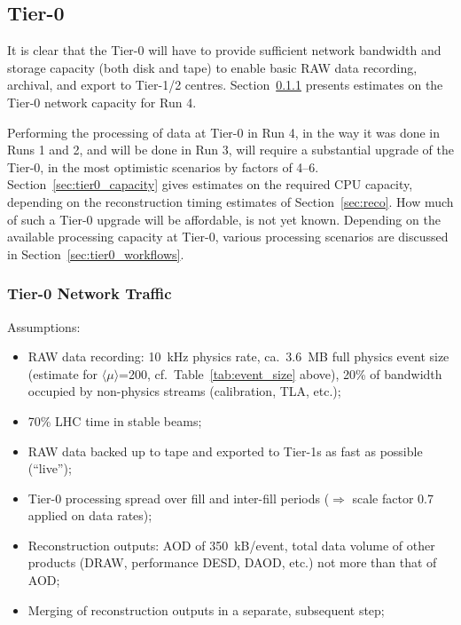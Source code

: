 \subsection{Tier-0}

It is clear that the Tier-0 will have to provide sufficient network bandwidth and storage capacity (both disk and tape) to enable basic RAW data recording, archival, and export to Tier-1/2 centres. Section~\ref{sec:tier0_network} presents estimates on the Tier-0 network capacity for Run 4.

Performing the processing of data at Tier-0 in Run 4, in the way it was done in Runs 1 and 2, and will be done in Run 3, will require a substantial upgrade of the Tier-0, in the most optimistic scenarios by factors of 4--6. Section~\ref{sec:tier0_capacity} gives estimates on the required CPU capacity, depending on the reconstruction timing estimates of Section~\ref{sec:reco}. How much of such a Tier-0 upgrade will be affordable, is not yet known. Depending on the available processing capacity at Tier-0, various processing scenarios are discussed in Section~\ref{sec:tier0_workflows}.

\subsubsection{Tier-0 Network Traffic}
\label{sec:tier0_network}

Assumptions: 

\begin{itemize}
  \item RAW data recording: 10~kHz physics rate, ca.\ 3.6~MB full physics event size (estimate for $\langle\mu\rangle$=200, cf.\ Table~\ref{tab:event_size} above), 20\% of bandwidth occupied by non-physics streams (calibration, TLA, etc.); 
  \item 70\% LHC time in stable beams;
  \item RAW data backed up to tape and exported to Tier-1s as fast as possible (``live'');
  \item Tier-0 processing spread over fill and inter-fill periods ($\Rightarrow$ scale factor 0.7 applied on data rates);
  \item Reconstruction outputs: AOD of 350~kB/event, total data volume of other products (DRAW, performance DESD, DAOD, etc.) not more than that of AOD; 
  \item Merging of reconstruction outputs in a separate, subsequent step;
\end{itemize}

